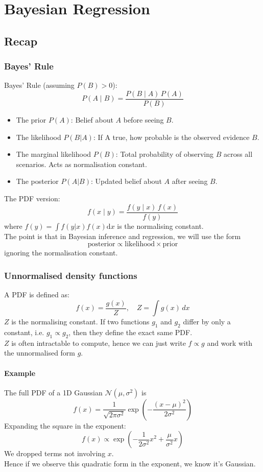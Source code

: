 \documentclass[../Probability.tex]{subfiles}
\begin{document}
\section{Bayesian Regression}
\subsection{Recap}
\subsubsection{Bayes' Rule}
Bayes' Rule (assuming $P(B)>0$):
$$P(A \mid B) = \frac{P(B \mid A)\, P(A)}{P(B)}$$
\begin{itemize}
    \item The prior $P(A)$: Belief about $A$ before seeing $B$.
    \item The likelihood $P(B|A)$: If A true, how probable is the observed evidence $B$.
    \item The marginal likelihood $P(B)$: Total probability of observing $B$ across all scenarios. Acts as normalisation constant.
    \item The posterior $P(A|B)$: Updated belief about $A$ after seeing $B$. 
\end{itemize}
The PDF version:
$$f(x \mid y) = \frac{f(y \mid x)\, f(x)}{f(y)}$$
where $f(y) = \int f(y | x)f(x) \mathrm{d}x$ is the normalising constant.\\
The point is that in Bayesian inference and regression, we will use the form
$$\text{posterior} \propto \text{likelihood} \times \text{prior}$$
ignoring the normalisation constant.

\subsubsection{Unnormalised density functions}
A PDF is defined as:
$$f(x) = \frac{g(x)}{Z}, \quad Z = \int g(x)\, dx$$
$Z$ is the normalising constant. If two functions $g_1$ and $g_2$ differ by only a constant, i.e. $g_1 \propto g_2$, then they define the exact same PDF.\\
$Z$ is often intractable to compute, hence we can just write $f \propto g$ and work with the unnormalised form $g$.

\paragraph{Example} The full PDF of a 1D Gaussian $\mathcal{N}(\mu, \sigma^2)$ is
$$f(x) = \frac{1}{\sqrt{2\pi\sigma^2}} \exp\!\left(-\frac{(x-\mu)^2}{2\sigma^2}\right)$$
Expanding the square in the exponent:
$$f(x) \propto \exp\!\left(-\frac{1}{2\sigma^2}x^2 + \frac{\mu}{\sigma^2}x\right)$$
We dropped terms not involving $x$.\\
Hence if we observe this quadratic form in the exponent, we know it's Gaussian.
\end{document}
